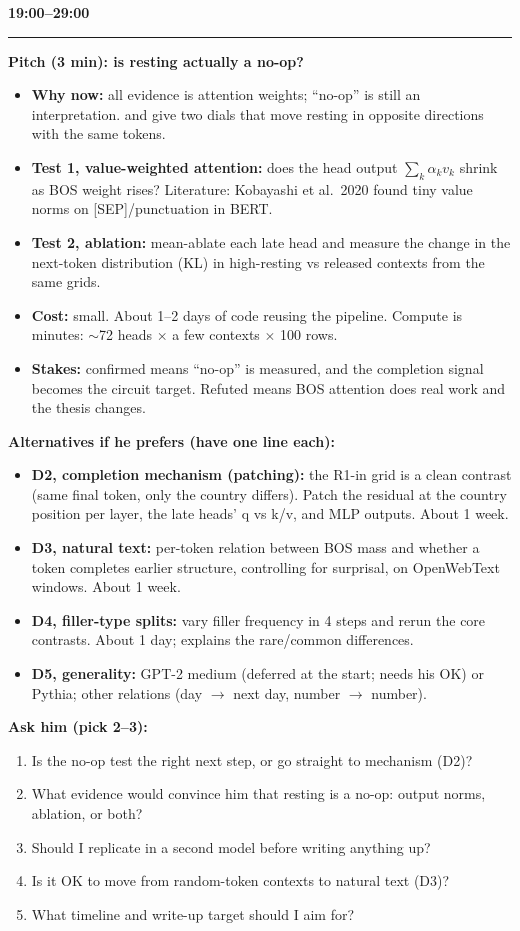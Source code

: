 \documentclass[10pt]{article}
\newcommand{\stage}[2]{\par\vspace{6pt}{\large\bfseries\color{cblue}#1}\hfill{\large\bfseries #2}\\[-4pt]\rule{\linewidth}{0.6pt}\par}
\newcommand{\lab}[1]{\textbf{\color{ink2}#1}}
\begin{document}
\stage{Next direction and planning}{19:00--29:00}
\lab{Pitch (3 min): is resting actually a no-op?}
\begin{itemize}
\item \textbf{Why now:} all evidence is attention weights; ``no-op'' is still an interpretation.  and  give two dials that move resting in opposite directions with the same tokens.
\item \textbf{Test 1, value-weighted attention:} does the head output $\sum_k \alpha_k v_k$ shrink as BOS weight rises? Literature: Kobayashi et al.\ 2020 found tiny value norms on [SEP]/punctuation in BERT.
\item \textbf{Test 2, ablation:} mean-ablate each late head and measure the change in the next-token distribution (KL) in high-resting vs released contexts from the same grids.
\item \textbf{Cost:} small. About 1--2 days of code reusing the pipeline. Compute is minutes: $\sim$72 heads $\times$ a few contexts $\times$ 100 rows.
\item \textbf{Stakes:} confirmed means ``no-op'' is measured, and the completion signal becomes the circuit target. Refuted means BOS attention does real work and the thesis changes.
\end{itemize}
\lab{Alternatives if he prefers (have one line each):}
\begin{itemize}
\item \textbf{D2, completion mechanism (patching):} the R1-in grid is a clean contrast (same final token, only the country differs). Patch the residual at the country position per layer, the late heads' q vs k/v, and MLP outputs. About 1 week.
\item \textbf{D3, natural text:} per-token relation between BOS mass and whether a token completes earlier structure, controlling for surprisal, on OpenWebText windows. About 1 week.
\item \textbf{D4, filler-type splits:} vary filler frequency in 4 steps and rerun the core contrasts. About 1 day; explains the rare/common differences.
\item \textbf{D5, generality:} GPT-2 medium (deferred at the start; needs his OK) or Pythia; other relations (day $\to$ next day, number $\to$ number).
\end{itemize}
\lab{Ask him (pick 2--3):}
\begin{enumerate}
\item Is the no-op test the right next step, or go straight to mechanism (D2)?
\item What evidence would convince him that resting is a no-op: output norms, ablation, or both?
\item Should I replicate in a second model before writing anything up?
\item Is it OK to move from random-token contexts to natural text (D3)?
\item What timeline and write-up target should I aim for?
\end{enumerate}
\end{document}
